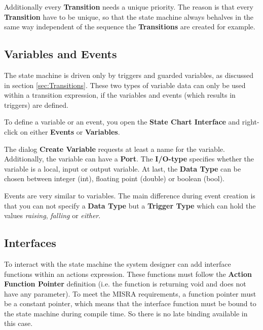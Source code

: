 Additionally every \textbf{Transition} needs a unique priority. The reason is
that every \textbf{Transition} have to be unique, so that the state machine
always behalves in the same way independent of the sequence the
\textbf{Transitions} are created for example.

\subsection{Variables and Events}

The state machine is driven only by triggers and guarded variables, as discussed
in section \ref{sec:Transitions}. These two types of variable data can only be
used within a transition expression, if the variables and events (which results
in triggers) are defined.

To define a variable or an event, you open the \textbf{State Chart Interface} and
right-click on either \textbf{Events} or \textbf{Variables}.

The dialog \textbf{Create Variable} requests at least a name for the variable.
Additionally, the variable can have a \textbf{Port}. The \textbf{I/O-type}
specifies whether the variable is a local, input or output variable. At last, the
\textbf{Data Type} can be chosen between integer (int), floating point (double)
or boolean (bool).

Events are very similar to variables. The main difference during event creation
is that you can not specify a \textbf{Data Type} but a \textbf{Trigger Type}
which can hold the values \textit{raising}, \textit{falling} or \textit{either}.

\subsection{Interfaces}

To interact with the state machine the system designer can add interface
functions within an actions expression. These functions must follow the
\textbf{Action Function Pointer} definition (i.e. the function is returning void
and does not have any parameter). To meet the MISRA requirements, a function
pointer must be a constant pointer, which means that the interface function must
be bound to the state machine during compile time. So there is no late binding
available in this case.
